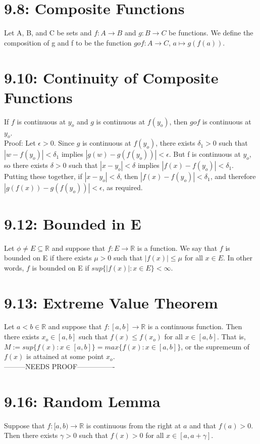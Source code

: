 \documentclass[10pt,letter]{report}
\begin{document}
\section*{9.8: Composite Functions}
Let A, B, and C be sets and $f: A\rightarrow B$ and $g:B\rightarrow C$ be functions. We define the composition of g and f to be the function $gof: A\rightarrow C$, $a\mapsto g(f(a))$.

\section*{9.10: Continuity of Composite Functions}
If $f$ is continuous at $y_o$ and $g$ is continuous at $f(y_o)$, then $gof$ is continuous at $y_o$. \\ 
Proof: Let $\epsilon>0$. Since $g$ is continuous at $f(y_o)$, there exists $\delta_1>0$ such that $|w-f(y_o)|<\delta_1$ implies $|g(w)-g(f(y_o))|<\epsilon$. But f is continuous at $y_o$, so there exists $\delta>0$ such that $|x-y_o|<\delta$ implies $|f(x)-f(y_o)|<\delta_1$. Putting these together, if $|x-y_o|<\delta$, then $|f(x)-f(y_o)|<\delta_1$, and therefore $|g(f(x))-g(f(y_o))|<\epsilon$, as required. 

\section*{9.12: Bounded in E}
Let $\phi\neq E\subseteq\mathbb{R}$ and suppose that $f:E\rightarrow\mathbb{R}$ is a function. We say that $f$ is bounded on E if there exists $\mu>0$ such that $|f(x)|\leq\mu$ for all $x\in E$. In other words, $f$ is bounded on E if $sup\{|f(x)|:x\in E\}<\infty$. 

\section*{9.13: Extreme Value Theorem}
Let $a<b\in\mathbb{R}$ and suppose that $f:[a,b]\rightarrow\mathbb{R}$ is a continuous function. Then there exists $x_o\in[a,b]$ such that $f(x)\leq f(x_o)$ for all $x\in[a,b]$. That is, $M:=sup\{f(x):x\in[a,b]\}=max\{f(x):x\in[a,b]\}$, or the supremeum of $f(x)$ is attained at some point $x_o$. \\ 
---------NEEDS PROOF----------------

\section*{9.16: Random Lemma}
Suppose that $f:[a,b)\rightarrow\mathbb{R}$ is continuous from the right at $a$ and that $f(a)>0$. Then there exists $\gamma>0$ such that $f(x)>0$ for all $x\in[a,a+\gamma]$. 
\end{document}
